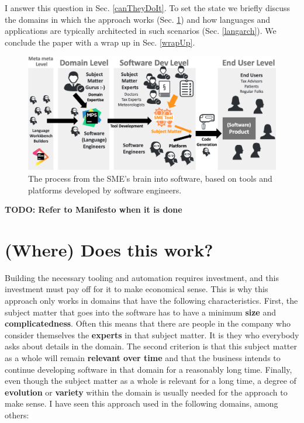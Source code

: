 \documentclass[runningheads]{llncs}
\newcommand{\sect}[1]{Sec. \ref{#1}}  %
\newcommand\todo[1]{\vspace{1mm}\noindent\textbf{\color{red} {{TODO: {#1}} }}}
\begin{document}
\noindent I
answer this question in \sect{canTheyDoIt}. To set the state we briefly 
discuss the domains in which the approach works (\sect{where}) and how
languages and applications are typically architected in such scenarios (\sect{langarch}).
We conclude the paper with a wrap up in \sect{wrapUp}.

\begin{figure}
\begin{center}
    \includegraphics[width=1\columnwidth]{figures/bigpic.png}
    \caption{The process from the SME's brain into software, based on
    tools and platforms developed by software engineers.}
    \label{bigpic}
\end{center} 
\end{figure} 

\todo{Refer to Manifesto when it is done}

\section{(Where) Does this work?}
\label{where}

Building the necessary tooling and automation requires investment, and this
investment must pay off for it to make economical sense. This is why this
approach only works in domains that have the following characteristics. First,
the subject matter that goes into the software has to have a minimum
\textbf{size} and \textbf{complicatedness}. Often this means that there are
people in the company who consider themselves the \textbf{experts} in that
subject matter. It is they who everybody asks about details in the domain.
The second criterion is that this subject matter as a whole will remain
\textbf{relevant over time} and that the business intends to continue developing
software in that domain for a reasonably long time. Finally, even though the
subject matter as a whole is relevant for a long time, a degree of
\textbf{evolution} or \textbf{variety} within the domain is usually needed for
the approach to make sense. I have seen this approach used in the following
domains, among others:
\end{document}
